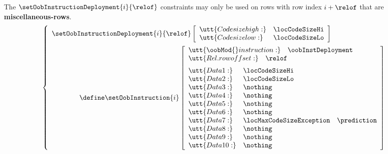 \saNote{} The $\setOobInstructionDeployment {i}{\relof}$ constraints may only be used on rows with row index $i + \relof$ that are \textbf{miscellaneous-rows}.
\[
        \left\{ \begin{array}{l}
                \setOobInstructionDeployment
                {i}{\relof}
                \left[ \begin{array}{ll}
                        \utt{Code size high:} & \locCodeSizeHi \\
                        \utt{Code size low:}  & \locCodeSizeLo \\
                \end{array} \right] \vspace{2mm} \\
                \qquad \qquad \define
                \setOobInstruction{i}
                \left[ \begin{array}{llr}
                        \multicolumn{3}{l}{\utt{\oobMod{} instruction:} \quad \oobInstDeployment}          \\
                        \multicolumn{3}{l}{\utt{Rel. row offset:}       \quad \relof}         \vspace{2mm} \\
                        \utt{Data 1:}  & \locCodeSizeHi           \\
                        \utt{Data 2:}  & \locCodeSizeLo           \\
                        \utt{Data 3:}  & \nothing                 \\
                        \utt{Data 4:}  & \nothing                 \\
                        \utt{Data 5:}  & \nothing                 \\
                        \utt{Data 6:}  & \nothing                 \\
                        \utt{Data 7:}  & \locMaxCodeSizeException  & \prediction \\
                        \utt{Data 8:}  & \nothing                 \\
                        \utt{Data 9:}  & \nothing                 \\
                        \utt{Data 10:} & \nothing                 \\
                \end{array} \right] \\
        \end{array} \right.
\]
